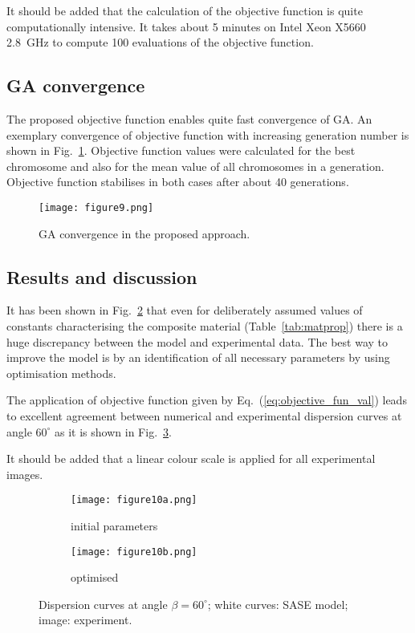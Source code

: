 \documentclass[preprint,12pt]{elsarticle}
\begin{document}
It should be added that the calculation of the objective function is quite computationally intensive. 
It takes about 5 minutes on Intel Xeon X5660 2.8~GHz to compute 100 evaluations of the objective function. 
\subsection{GA convergence}
The proposed objective function enables quite fast convergence of GA. 
An exemplary convergence of objective function with increasing generation number is shown in Fig.~\ref{fig:GAconvergence}. 
Objective function values were calculated for the best chromosome and also for the mean value of all chromosomes in a generation. 
Objective function stabilises in both cases after about 40 generations.
	\begin{figure} [h!]
		\centering
		\texttt{[image: figure9.png]}
		\caption{GA convergence in the proposed approach.}
		\label{fig:GAconvergence}
	\end{figure}
	\subsection{Results and discussion}
 It has been shown in Fig.~\ref{fig:dispersion60deg_initial} that even for deliberately assumed values of constants characterising the composite material (Table~\ref{tab:matprop}) there is a huge discrepancy between the model and experimental data. The best way to improve the model is by an identification of all necessary parameters by using optimisation methods.
 
 The application of objective function given by Eq.~(\ref{eq:objective_fun_val}) leads to excellent agreement between numerical and experimental dispersion curves at angle \(60^{\circ}\) as it is shown in Fig.~\ref{fig:dispersion60deg}.
 
 It should be added that a linear colour scale is applied for all experimental images.
	\begin{figure} [h!]
		\centering
		\begin{subfigure}[b]{0.47\textwidth}
			\centering
		   \texttt{[image: figure10a.png]}
			\caption{initial parameters}
			\label{fig:dispersion60deg_initial}
		\end{subfigure}
	\hfill
		\begin{subfigure}[b]{0.47\textwidth}
			\centering
			\texttt{[image: figure10b.png]}
			\caption{optimised}
			\label{fig:dispersion60deg}
		\end{subfigure}
	\caption{Dispersion curves at angle \(\beta = 60^{\circ}\); white curves: SASE 
	model; 
	image: experiment. }
	\label{fig:initial_optimized}
	\end{figure}
\end{document}
